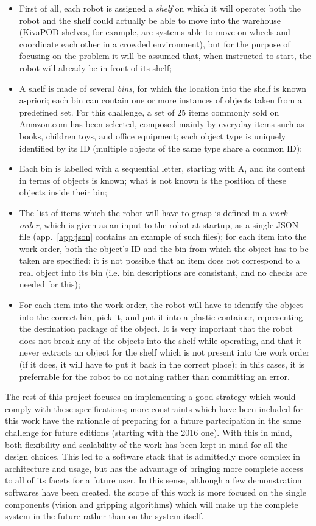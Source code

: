 \begin{itemize}

\item{First of all, each robot is assigned a \emph{shelf} on which it will
operate; both the robot and the shelf could actually be able to move
into the warehouse (KivaPOD shelves, for example, are systems able to
move on wheels and coordinate each other in a crowded environment),
but for the purpose of focusing on the problem it will be assumed
that, when instructed to start, the robot will already be in front of
its shelf;}
\item{A shelf is made of several \emph{bins}, for which the location
into the shelf is known a-priori; each bin can contain one or more
instances of objects taken from a predefined set. For this challenge,
a set of 25 items commonly sold on Amazon.com has been selected,
composed mainly by everyday items such as books, children toys, and
office equipment; each object type is uniquely identified by its ID
(multiple objects of the same type share a common ID);}
\item{Each bin is labelled with a sequential letter, starting with A,
and its content in terms of objects is known; what is not known is the
position of these objects inside their bin;}
\item{The list of items which the robot will have to grasp is defined
in a \emph{work order}, which is given as an input to the robot at
startup, as a single JSON file (app.~\ref{app:json} contains an
example of such files); for each item into the work order, both the object's ID and
the bin from which the object has to be taken are specified; it is not
possible that an item does not correspond to a real object into its
bin (i.e. bin descriptions are consistant, and no checks are needed
for this);}
\item{For each item into the work order, the robot will have to
identify the object into the correct bin, pick it, and put it into a
plastic container, representing the destination package of the
object. It is very important that the robot does not break any of the
objects into the shelf while operating, and that it never extracts an
object for the shelf which is not present into the work order (if it
does, it will have to put it back in the correct place); in this
cases, it is preferrable for the robot to do nothing rather than
committing an error.}
\end{itemize}

The rest of this project focuses on implementing a good strategy which
would comply with these specifications; more constraints which have
been included for this work have the rationale of preparing for a
future partecipation in the same challenge for future editions
(starting with the 2016 one). With this in mind, both flexibility and
scalability of the work has been kept in mind for all the design
choices. This led to a software stack that is admittedly more
complex in architecture and usage, but has the advantage of bringing
more complete access to all of its facets for a future user. In this
sense, although a few demonstration softwares have been created, the
scope of this work is more focused on the single components (vision
and gripping algorithms) which will make up the complete system in the
future rather than on the system itself.
